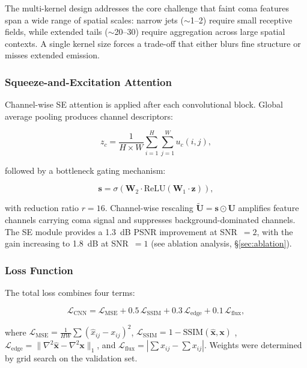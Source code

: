 \documentclass[usenatbib]{mnras}
\begin{document}
The multi-kernel design addresses the core challenge that faint coma features span a wide range of spatial scales: narrow jets ($\sim$1--2\arcsec) require small receptive fields, while extended tails ($\sim$20--30\arcsec) require aggregation across large spatial contexts. A single kernel size forces a trade-off that either blurs fine structure or misses extended emission.

\subsubsection{Squeeze-and-Excitation Attention}

Channel-wise SE attention \citep{hu18} is applied after each convolutional block. Global average pooling produces channel descriptors:

\begin{equation}\label{eq:se_squeeze}
z_c = \frac{1}{H \times W} \sum_{i=1}^{H} \sum_{j=1}^{W} u_c(i, j),
\end{equation}

followed by a bottleneck gating mechanism:

\begin{equation}\label{eq:se_excitation}
\mathbf{s} = \sigma\left(\mathbf{W}_2 \cdot \text{ReLU}\left(\mathbf{W}_1 \cdot \mathbf{z}\right)\right),
\end{equation}

with reduction ratio $r=16$. Channel-wise rescaling $\tilde{\mathbf{U}} = \mathbf{s} \odot \mathbf{U}$ amplifies feature channels carrying coma signal and suppresses background-dominated channels. The SE module provides a 1.3~dB PSNR improvement at SNR~$=2$, with the gain increasing to 1.8~dB at SNR~$=1$ (see ablation analysis, \S\ref{sec:ablation}).

\subsubsection{Loss Function}

The total loss combines four terms:

\begin{equation}\label{eq:total_loss}
\mathcal{L}_{\text{CNN}} = \mathcal{L}_{\text{MSE}} + 0.5\,\mathcal{L}_{\text{SSIM}} + 0.3\,\mathcal{L}_{\text{edge}} + 0.1\,\mathcal{L}_{\text{flux}},
\end{equation}

where $\mathcal{L}_{\text{MSE}} = \frac{1}{HW}\sum(\hat{x}_{ij} - x_{ij})^2$, $\mathcal{L}_{\text{SSIM}} = 1 - \text{SSIM}(\hat{\mathbf{x}}, \mathbf{x})$ \citep{wang04}, $\mathcal{L}_{\text{edge}} = \|\nabla^2\hat{\mathbf{x}} - \nabla^2\mathbf{x}\|_1$, and $\mathcal{L}_{\text{flux}} = |\sum\hat{x}_{ij} - \sum x_{ij}|$. Weights were determined by grid search on the validation set.
\end{document}
